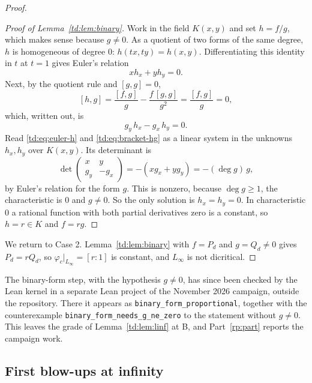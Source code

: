 \documentclass[a4paper,11pt]{article}
\theoremstyle{jsplain}
\theoremstyle{jsdef}
\theoremstyle{jsrem}
\begin{document}
\begin{proof}
\begin{proof}[Proof of Lemma~\ref{td:lem:binary}]
Work in the field $K(x,y)$ and set $h = f/g$, which makes sense because $g \neq 0$. As a quotient
of two forms of the same degree, $h$ is homogeneous of degree $0$: $h(tx, ty) = h(x,y)$.
Differentiating this identity in $t$ at $t = 1$ gives Euler's relation
\begin{equation}\label{td:eq:euler-h}
x h_x + y h_y = 0.
\end{equation}
Next, by the quotient rule and $[g,g] = 0$,
\[
[h, g] = \frac{[f,g]}{g} - \frac{f\,[g,g]}{g^2} = \frac{[f,g]}{g} = 0,
\]
which, written out, is
\begin{equation}\label{td:eq:bracket-hg}
g_y\, h_x - g_x\, h_y = 0.
\end{equation}
Read \eqref{td:eq:euler-h} and \eqref{td:eq:bracket-hg} as a linear system in the unknowns
$h_x, h_y$ over $K(x,y)$. Its determinant is
\[
\det\begin{pmatrix} x & y \\ g_y & -g_x \end{pmatrix} = -(x g_x + y g_y) = -(\deg g)\, g,
\]
by Euler's relation for the form $g$. This is nonzero, because $\deg g \geq 1$, the
characteristic is $0$ and $g \neq 0$. So the only solution is $h_x = h_y = 0$. In characteristic
$0$ a rational function with both partial derivatives zero is a constant, so $h = r \in K$ and
$f = r g$.
\end{proof}

We return to Case 2. Lemma~\ref{td:lem:binary} with $f = P_d$ and $g = Q_d \neq 0$ gives
$P_d = r Q_d$, so $\varphi_c|_{L_\infty} = [r : 1]$ is constant, and $L_\infty$ is not dicritical.
\end{proof}

The binary-form step, with the hypothesis $g \neq 0$, has since been checked by the Lean kernel in
a separate Lean project of the November 2026 campaign, outside the repository. There it appears as
\texttt{binary\_\allowbreak{}form\_\allowbreak{}proportional}, together with the counterexample
\texttt{binary\_\allowbreak{}form\_\allowbreak{}needs\_\allowbreak{}g\_\allowbreak{}ne\_\allowbreak{}zero} to the statement without $g \neq 0$. This leaves the grade of
Lemma~\ref{td:lem:linf} at B, and Part~\ref{rp:part} reports the campaign work.

\subsection{First blow-ups at infinity}\label{td:sec:e1lemma}
\end{document}
